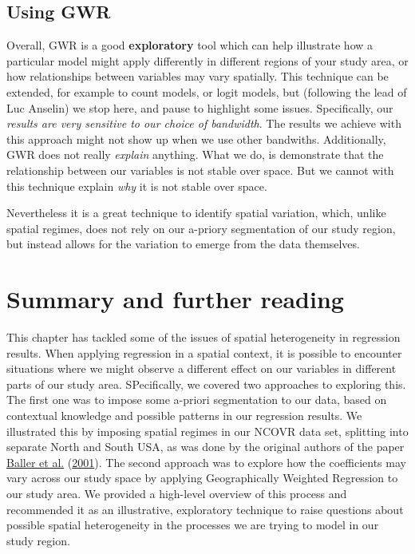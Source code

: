 \documentclass[
  krantz2]{krantz}
\begin{document}
\hypertarget{using-gwr}{%
\subsection{Using GWR}\label{using-gwr}}

Overall, GWR is a good \textbf{exploratory} tool which can help illustrate how a particular model might apply differently in different regions of your study area, or how relationships between variables may vary spatially. This technique can be extended, for example to count models, or logit models, but (following the lead of Luc Anselin) we stop here, and pause to highlight some issues. Specifically, our \emph{results are very sensitive to our choice of bandwidth}. The results we achieve with this approach might not show up when we use other bandwiths. Additionally, GWR does not really \emph{explain} anything. What we do, is demonstrate that the relationship between our variables is not stable over space. But we cannot with this technique explain \emph{why} it is not stable over space.

Nevertheless it is a great technique to identify spatial variation, which, unlike spatial regimes, does not rely on our a-priory segmentation of our study region, but instead allows for the variation to emerge from the data themselves.

\hypertarget{summary-and-further-reading-8}{%
\section{Summary and further reading}\label{summary-and-further-reading-8}}

This chapter has tackled some of the issues of spatial heterogeneity in regression results. When applying regression in a spatial context, it is possible to encounter situations where we might observe a different effect on our variables in different parts of our study area. SPecifically, we covered two approaches to exploring this. The first one was to impose some a-priori segmentation to our data, based on contextual knowledge and possible patterns in our regression results. We illustrated this by imposing spatial regimes in our NCOVR data set, splitting into separate North and South USA, as was done by the original authors of the paper \protect\hyperlink{ref-Baller_2001}{Baller et al.} (\protect\hyperlink{ref-Baller_2001}{2001}). The second approach was to explore how the coefficients may vary across our study space by applying Geographically Weighted Regression to our study area. We provided a high-level overview of this process and recommended it as an illustrative, exploratory technique to raise questions about possible spatial heterogeneity in the processes we are trying to model in our study region.
\end{document}
